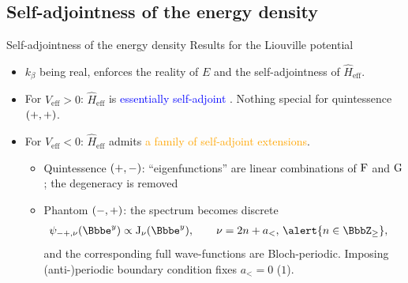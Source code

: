 \documentclass[8pt]{beamer}
\begin{document}
\subsection{Self-adjointness of the energy density}

\begin{frame}%
{Self-adjointness of the energy density}%
{Results for the Liouville potential}
\begin{itemize}
\item $k_\beta$ being real, enforces the reality of $E$ and the
self-adjointness of $\widehat{H}_{\text{eff}}$.

\item For $V_{\text{eff}} > 0$: $\widehat{H}_\text{eff}$ is
\textcolor{blue}{essentially self-adjoint}%
. 
Nothing special for quintessence ${\left(+, +\right)}$.

\item For $V_{\text{eff}} < 0$: $\widehat{H}_\text{eff}$ admits
\textcolor{orange}{a family of self-adjoint extensions}.
\begin{itemize}
\item Quintessence ${\left(+,-\right)}$: ``eigenfunctions'' are
linear combinations of $\operatorname{F}$ and $\operatorname{G}$;
\alert{the degeneracy is removed}
\item Phantom ${\left(-, +\right)}$: the spectrum becomes \alert{discrete}
\begin{align}
\rfun{\psi_{-+,\nu}}{\ee^y} &\propto
\rfun{\BesselJ_{\nu}}{\ee^y},\qquad \nu = 2n+a_<,\, \alert{n \in
\BbbZ_\ge},
\label{eq:Phi_nu}
\end{align}
and the corresponding full wave-functions are Bloch-periodic.
Imposing (anti-)periodic boundary condition fixes $a_< = 0$ ($1$).
\end{itemize}





\end{itemize}
\end{frame}
\end{document}
